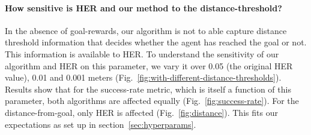 \paragraph{How sensitive is HER and our method to the distance-threshold?}
In the absence of goal-rewards, our algorithm is not to able capture distance
threshold information that decides whether the agent has reached the goal or
not. This information is available to HER. To understand the
sensitivity of our algorithm and HER on this parameter, we vary it over
0.05 (the original HER value), 0.01 and 0.001 meters
(Fig.~\ref{fig:with-different-distance-thresholds}). Results show that
for the success-rate metric, which is itself a function of this
parameter, both algorithms are affected equally
(Fig.~\ref{fig:success-rate}). 
For the distance-from-goal,
only HER is affected (Fig.~\ref{fig:distance}). This fits our expectations as set up in 
section~\ref{sec:hyperparams}.




